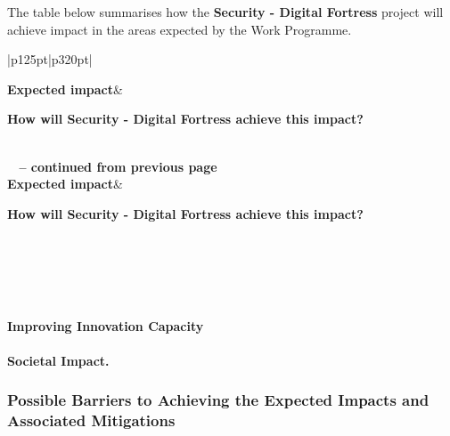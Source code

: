 \documentclass[a4paper,11pt]{article}
\newcommand{\project}[1]{\textbf{#1}\xspace}
\newcommand{\SECURITY}{\project{Security - Digital Fortress}}
\newcommand{\TheProject}{\SECURITY}
\begin{document}
The table below summarises how the \TheProject{} project will achieve impact in the areas expected by the Work Programme.


\begin{longtable}{|p{125pt}|p{320pt}|}%

\hline \textbf{Expected impact}&

\textbf{How will \TheProject{} achieve this impact?}\\\\ \hline
\endfirsthead

%
{{\bfseries \tablename\ \thetable{} -- continued from previous
page}} \\ \hline \textbf{Expected impact}&

\textbf{How will \TheProject{} achieve this impact?}\\\\ \hline
\endhead

\hline {} \\ \hline
\endfoot

\hline \hline
\endlastfoot

\vspace{10pt}
\\
 \hline
\end{longtable}


\pagebreak
\paragraph*{Improving Innovation Capacity}
\noindent

\paragraph*{Societal Impact.}
\noindent
\subsubsection*{Possible Barriers to Achieving the Expected Impacts and Associated Mitigations}

\end{document}
